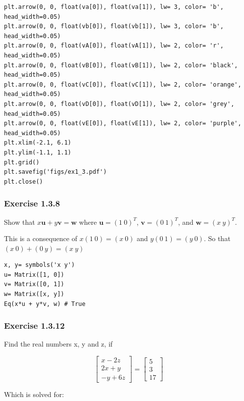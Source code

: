 \begin{verbatim}
plt.arrow(0, 0, float(va[0]), float(va[1]), lw= 3, color= 'b', head_width=0.05)
plt.arrow(0, 0, float(vb[0]), float(vb[1]), lw= 3, color= 'b', head_width=0.05)
plt.arrow(0, 0, float(vA[0]), float(vA[1]), lw= 2, color= 'r', head_width=0.05)
plt.arrow(0, 0, float(vB[0]), float(vB[1]), lw= 2, color= 'black', head_width=0.05)
plt.arrow(0, 0, float(vC[0]), float(vC[1]), lw= 2, color= 'orange', head_width=0.05)
plt.arrow(0, 0, float(vD[0]), float(vD[1]), lw= 2, color= 'grey', head_width=0.05)
plt.arrow(0, 0, float(vE[0]), float(vE[1]), lw= 2, color= 'purple', head_width=0.05)
plt.xlim(-2.1, 6.1)
plt.ylim(-1.1, 1.1)
plt.grid()
plt.savefig('figs/ex1_3.pdf')
plt.close()
\end{verbatim}

\subsubsection{Exercise 1.3.8}
Show that $x\mathbf{u} + y\mathbf{v} = \mathbf{w}$ where
$\mathbf{u}= (1\ 0)^{T}$, $\mathbf{v}= (0\ 1)^{T}$, and $\mathbf{w}= (x\ y)^{T}$.

This is a consequence of $x(1\ 0) = (x\ 0)$ and $y(0\ 1) = (y\ 0)$. So that
$(x\ 0) + (0\ y) = (x\ y)$

\begin{verbatim}
x, y= symbols('x y')
u= Matrix([1, 0])
v= Matrix([0, 1])
w= Matrix([x, y])
Eq(x*u + y*v, w) # True
\end{verbatim}

\subsubsection{Exercise 1.3.12}

Find the real numbers x, y and z, if

\begin{equation}\label{eq:na}
\left[\begin{matrix}x - 2 z\\2 x + y\\- y + 6 z\end{matrix}\right] = \left[\begin{matrix}5\\3\\17\end{matrix}\right]
\end{equation}

Which is solved for:

